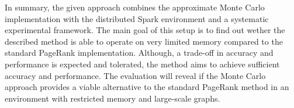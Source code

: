 In summary, the given approach combines the approximate Monte Carlo  implementation with the distributed Spark environment and a systematic experimental framework. The main goal of this setup is to find out wether the described method is able to operate on very limited memory compared to the standard PageRank implementation. Although, a trade-off in accuracy and performance is expected and tolerated, the method aims to achieve sufficient accuracy and performance. The evaluation will reveal if the Monte Carlo approach provides a viable alternative to the standard PageRank method in an environment with restricted memory and large-scale graphs.
